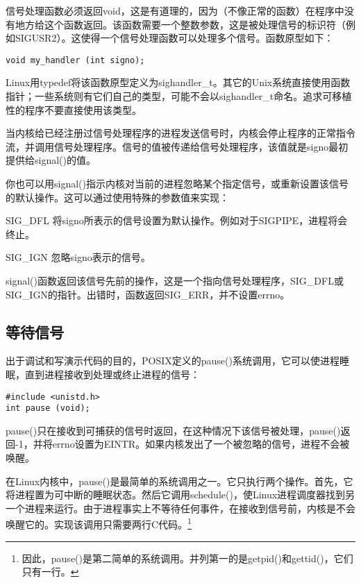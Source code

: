 信号处理函数必须返回void，这是有道理的，因为（不像正常的函数）在程序中没有地方给这个函数返回。该函数需要一个整数参数，这是被处理信号的标识符（例如SIGUSR2）。这使得一个信号处理函数可以处理多个信号。函数原型如下：

\begin{lstlisting}
void my_handler (int signo);
\end{lstlisting}

Linux用typedef将该函数原型定义为sighandler\_t。其它的Unix系统直接使用函数指针；一些系统则有它们自己的类型，可能不会以sighandler\_t命名。追求可移植性的程序不要直接使用该类型。

当内核给已经注册过信号处理程序的进程发送信号时，内核会停止程序的正常指令流，并调用信号处理程序。信号的值被传递给信号处理程序，该值就是signo最初提供给signal()的值。

你也可以用signal()指示内核对当前的进程忽略某个指定信号，或重新设置该信号的默认操作。这可以通过使用特殊的参数值来实现：

\begin{eqlist*}
\item[SIG\_DFL] 将signo所表示的信号设置为默认操作。例如对于SIGPIPE，进程将会终止。
\item[SIG\_IGN] 忽略signo表示的信号。
\end{eqlist*}

signal()函数返回该信号先前的操作，这是一个指向信号处理程序，SIG\_DFL或SIG\_IGN的指针。出错时，函数返回SIG\_ERR，并不设置errno。

\subsection{等待信号}

 出于调试和写演示代码的目的，POSIX定义的pause()系统调用，它可以使进程睡眠，直到进程接收到处理或终止进程的信号：

\begin{lstlisting}
#include <unistd.h>
int pause (void);
\end{lstlisting}

pause()只在接收到可捕获的信号时返回，在这种情况下该信号被处理，pause()返回-1，并将errno设置为EINTR。如果内核发出了一个被忽略的信号，进程不会被唤醒。

在Linux内核中，pause()是最简单的系统调用之一。它只执行两个操作。首先，它将进程置为可中断的睡眠状态。然后它调用schedule()，使Linux进程调度器找到另一个进程来运行。由于进程事实上不等待任何事件，在接收到信号前，内核是不会唤醒它的。实现该调用只需要两行C代码。\footnote[1]{因此，pause()是第二简单的系统调用。并列第一的是getpid()和gettid()，它们只有一行。}

